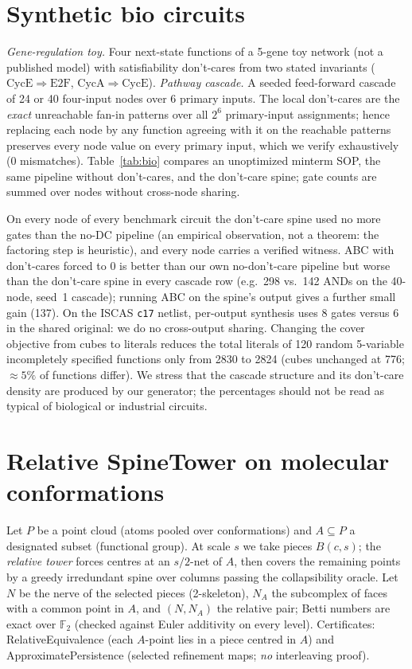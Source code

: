 \documentclass[11pt]{article}
\begin{document}
\section{Synthetic bio circuits}
\emph{Gene-regulation toy.}  Four next-state functions of a 5-gene toy network
(not a published model) with satisfiability don't-cares from two stated
invariants ($\mathrm{CycE}\Rightarrow\mathrm{E2F}$,
$\mathrm{CycA}\Rightarrow\mathrm{CycE}$).
\emph{Pathway cascade.}  A seeded feed-forward cascade of 24 or 40 four-input nodes over 6
primary inputs.  The local don't-cares are the \emph{exact} unreachable fan-in
patterns over all $2^6$ primary-input assignments; hence replacing each node by
any function agreeing with it on the reachable patterns preserves every node
value on every primary input, which we verify exhaustively (0 mismatches).
Table~\ref{tab:bio} compares an unoptimized minterm SOP, the same pipeline
without don't-cares, and the don't-care spine; gate counts are summed over nodes
without cross-node sharing.



On every node of every benchmark circuit the don't-care spine used no more gates
than the no-DC pipeline (an empirical observation, not a theorem: the factoring
step is heuristic), and every node carries a verified witness.  ABC with
don't-cares forced to $0$ is better than our own no-don't-care pipeline but worse than the
don't-care spine in every cascade row (e.g.\ 298 vs.\ 142 ANDs on the 40-node, seed~1
cascade); running ABC on the spine's output gives a further small gain (137).  On the ISCAS
\texttt{c17} netlist, per-output synthesis uses 8 gates versus 6 in the shared original:
we do no cross-output sharing.  Changing the cover objective from cubes to literals reduces the total
literals of 120 random 5-variable incompletely specified functions only from 2830 to 2824
(cubes unchanged at 776; $\approx5\%$ of functions differ).  We stress that the cascade structure and its
don't-care density are produced by our generator; the percentages should not be
read as typical of biological or industrial circuits.

\section{Relative SpineTower on molecular conformations}
Let $P$ be a point cloud (atoms pooled over conformations) and $A\subseteq P$ a
designated subset (functional group).  At scale $s$ we take pieces
$B(c,s)$; the \emph{relative tower} forces centres at an $s/2$-net of $A$, then
covers the remaining points by a greedy irredundant spine over columns passing
the collapsibility oracle.  Let $N$ be the nerve of the selected pieces
(2-skeleton), $N_A$ the subcomplex of faces with a common point in $A$, and
$(N,N_A)$ the relative pair; Betti numbers are exact over $\mathbb F_2$ (checked
against Euler additivity on every level).  Certificates: \textsf{RelativeEquivalence}
(each $A$-point lies in a piece centred in $A$) and \textsf{ApproximatePersistence}
(selected refinement maps; \emph{no} interleaving proof).
\end{document}
